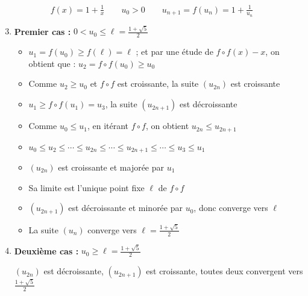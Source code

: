 \begin{frame}
\begin{exemple}
$$f(x)=1+\tfrac1x \qquad u_0 >0 \qquad u_{n+1} = f(u_n)= 1 + \tfrac{1}{u_n}$$
\vspace*{-3.5ex}
\begin{enumerate}
 \setcounter{enumi}{2}
  \item \textbf{Premier cas :} $0 < u_0 \le \ell = \frac{1+\sqrt{5}}{2}$
\pause  
  \begin{itemize}[<+->]
    \item $u_1 = f(u_0) \ge f(\ell)=\ell$ ; et par une étude de $f\circ f(x)-x$, 
  on obtient que  :  $u_2 = f\circ f(u_0) \ge u_0$ 
  
    \item Comme $u_2 \ge u_0$ et $f\circ f$ est croissante, la suite $(u_{2n})$ est croissante
    
    \item $u_1  \ge f\circ f(u_1)=u_3$, la suite $(u_{2n+1})$ est décroissante
    
    \item Comme  $u_0 \le u_1$, en itérant $f\circ f$, on obtient $u_{2n} \le u_{2n+1}$
    
    \item $u_0 \le u_2 \le \cdots \le u_{2n} \le \cdots \le u_{2n+1} \le \cdots \le u_3 \le u_1$
    
     \item $(u_{2n})$ est croissante et majorée par $u_1$
     
     \item Sa limite est l'unique point fixe $\ell$ de $f\circ f$
     
     \item $(u_{2n+1})$ est décroissante et minorée par $u_0$, donc converge vers $\ell$
     
     \item La suite $(u_{n})$ converge vers $\ell = \frac{1+\sqrt{5}}{2}$
  \end{itemize}

 
 \pause
 
  \item \textbf{Deuxième cas :} $u_0 \ge \ell = \frac{1+\sqrt{5}}{2}$

  \pause
  
  $(u_{2n})$ est décroissante, $(u_{2n+1})$ est croissante, toutes deux convergent vers $\frac{1+\sqrt{5}}{2}$
    
\end{enumerate}  
\end{exemple}
\end{frame}






